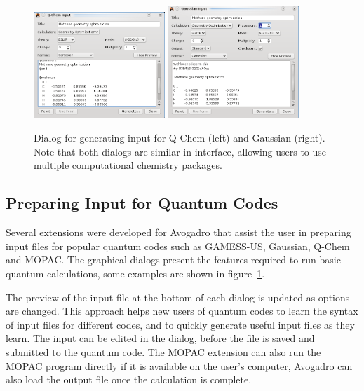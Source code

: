 \documentclass{article}
\begin{document}
\begin{figure}
  \includegraphics[width=0.44\textwidth]{images/avogadro-q-chem}
  \hspace{0.1cm}
  \includegraphics[width=0.44\textwidth]{images/avogadro-gaussian}
  \caption{Dialog for generating input for Q-Chem (left) and Gaussian (right).
    Note that both dialogs are similar in interface, allowing users to use
    multiple computational chemistry packages.}
  \label{f:quantumdialogs}
\end{figure}

\subsection{Preparing Input for Quantum Codes}

Several extensions were developed for Avogadro that assist the user in preparing input files for popular quantum codes such as GAMESS-US, Gaussian, Q-Chem and MOPAC. The graphical dialogs present the features required to run basic quantum calculations, some examples are shown in figure~\ref{f:quantumdialogs}.

The preview of the input file at the bottom of each dialog is updated as options are changed. This approach helps new users of quantum codes to learn the syntax of input files for different codes, and to quickly generate useful input files as they learn. The input can be edited in the dialog, before the file is saved and submitted to the quantum code. The MOPAC extension can also run the  MOPAC program directly if it is available on the user's computer, Avogadro can also load the output file once the calculation is complete.
\end{document}
